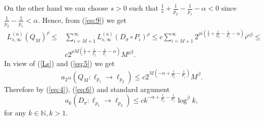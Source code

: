 \documentclass[12pt]{article}
\newcommand{\N}{{\mathbb N}}
\begin{document}
On the other hand  we can choose $s>0$  such that $\frac{1}{s} + \frac{1}{p_2}-\frac{1}{p_1}-\alpha <0$ since   $\frac{1}{p_2}-\frac{1}{p_1}<\alpha$. Hence, from (\ref{eq:9})   we get %
\begin{align}\label{eq:5}
	L_{s,\infty}^{(a)}(Q_M)^\rho\leq & \sum_{i=M+1}^{\infty}L_{s,\infty}^{(a)}(D_\sigma\circ P_i)^\rho\leq c\sum_{i=M+1}^{\infty} 2^{\rho i(\frac{1}{s} + \frac{1}{p_2}-\frac{1}{p_1}-\alpha)}i^{\rho\beta}\leq\\
	 & c 2^{\rho M(\frac{1}{s} + \frac{1}{p_2}-\frac{1}{p_1}-\alpha)}M^{\rho\beta}.
	 \nonumber	
\end{align}
In view of (\ref{Ls}) and (\ref{eq:5}) we get
\begin{equation}
	a_{2^M}(Q_M:\ell_{p_1}\rightarrow \ell_{p_2})\leq c 2^{ M(-\alpha+ \frac{1}{p_2}-\frac{1}{p_1})}M^\beta.
	\label{eq:6}
\end{equation}
Therefore by (\ref{eq:4}), (\ref{eq:6}) and standard argument  
\begin{equation*}
	a_{k}(D_\sigma:\ell_{p_1}\rightarrow \ell_{p_2})\leq  c k^{ -\alpha+ \frac{1}{p_2}-\frac{1}{p_1}}\log^\beta k,
\end{equation*}
for any $k\in\N, k>1$.
\end{document}
